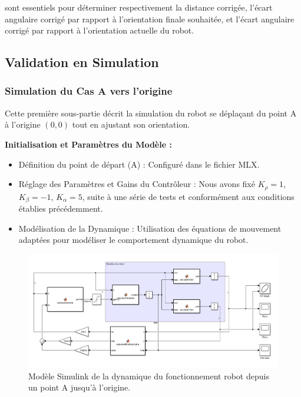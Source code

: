 sont essentiels pour déterminer respectivement la distance corrigée, l'écart angulaire corrigé par rapport à l'orientation finale souhaitée, et l'écart angulaire corrigé par rapport à l'orientation actuelle du robot.


\subsection{Validation en Simulation}





\subsubsection{Simulation du Cas A vers l’origine}

Cette première sous-partie décrit la simulation du robot se déplaçant du point A à l'origine $(0,0)$ tout en ajustant son orientation.

\textbf{Initialisation et Paramètres du Modèle :}

\begin{itemize}
    \item Définition du point de départ (A) : Configuré dans le fichier MLX.
    \item Réglage des Paramètres et Gains du Contrôleur : Nous avons fixé $K_\rho = 1$, $K_\beta = -1$, $K_\alpha = 5$, suite à une série de tests et conformément aux conditions établies précédemment.
    \item Modélisation de la Dynamique : Utilisation des équations de mouvement adaptées pour modéliser le comportement dynamique du robot.
\end{itemize}

\begin{figure}[!h]
    \centering
    \includegraphics[width=1.0\textwidth]{img/diagrams/4modelisaiton_matlab.png} 
    \caption{Modèle Simulink de la dynamique du fonctionnement robot depuis un point A jusqu'à l'origine.}
    \label{img:simulink1}
\end{figure}


